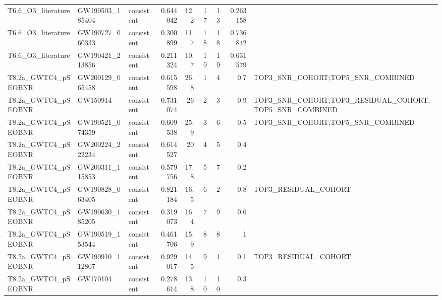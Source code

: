 \begin{tabular}{lllrrrrrl}
T6.6\_O3\_literature & GW190503\_185404 & consistent & 0.644042 & 12.2 & 17 & 13 & 0.263158 &  \\
T6.6\_O3\_literature & GW190727\_060333 & consistent & 0.300899 & 11.7 & 18 & 18 & 0.736842 &  \\
T6.6\_O3\_literature & GW190421\_213856 & consistent & 0.211324 & 10.7 & 19 & 19 & 0.631579 &  \\
T8.2a\_GWTC4\_pSEOBNR & GW200129\_065458 & consistent & 0.615598 & 26.8 & 1 & 4 & 0.7 & TOP3\_SNR\_COHORT;TOP5\_SNR\_COMBINED \\
T8.2a\_GWTC4\_pSEOBNR & GW150914 & consistent & 0.731074 & 26 & 2 & 3 & 0.9 & TOP3\_SNR\_COHORT;TOP3\_RESIDUAL\_COHORT;TOP5\_SNR\_COMBINED \\
T8.2a\_GWTC4\_pSEOBNR & GW190521\_074359 & consistent & 0.609538 & 25.9 & 3 & 6 & 0.5 & TOP3\_SNR\_COHORT;TOP5\_SNR\_COMBINED \\
T8.2a\_GWTC4\_pSEOBNR & GW200224\_222234 & consistent & 0.614527 & 20 & 4 & 5 & 0.4 &  \\
T8.2a\_GWTC4\_pSEOBNR & GW200311\_115853 & consistent & 0.579756 & 17.8 & 5 & 7 & 0.2 &  \\
T8.2a\_GWTC4\_pSEOBNR & GW190828\_063405 & consistent & 0.821184 & 16.5 & 6 & 2 & 0.8 & TOP3\_RESIDUAL\_COHORT \\
T8.2a\_GWTC4\_pSEOBNR & GW190630\_185205 & consistent & 0.319073 & 16.4 & 7 & 9 & 0.6 &  \\
T8.2a\_GWTC4\_pSEOBNR & GW190519\_153544 & consistent & 0.461706 & 15.9 & 8 & 8 & 1 &  \\
T8.2a\_GWTC4\_pSEOBNR & GW190910\_112807 & consistent & 0.929017 & 14.5 & 9 & 1 & 0.1 & TOP3\_RESIDUAL\_COHORT \\
T8.2a\_GWTC4\_pSEOBNR & GW170104 & consistent & 0.278614 & 13.8 & 10 & 10 & 0.3 &  \\
\bottomrule
\end{tabular}
